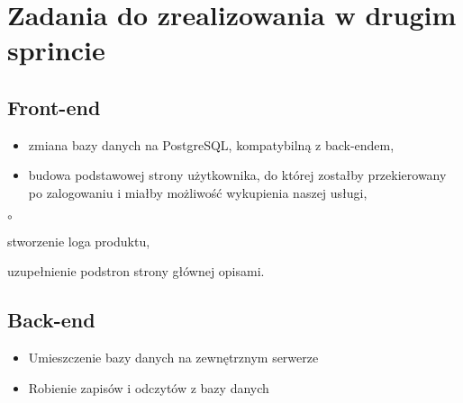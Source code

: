 \section{Zadania do zrealizowania w drugim sprincie}

\subsection*{Front-end}
\begin{itemize}
  \item zmiana bazy danych na PostgreSQL, kompatybilną z back-endem,
  \item budowa podstawowej strony użytkownika, do której zostałby przekierowany po zalogowaniu i miałby możliwość wykupienia naszej usługi,
\end{itemize}
\begin{list}{$\circ$}{} 
  \item stworzenie loga produktu,
  \item uzupełnienie podstron strony głównej opisami.
\end{list}

\subsection*{Back-end}
\begin{itemize}
    \item Umieszczenie bazy danych na zewnętrznym serwerze 
    \item Robienie zapisów i odczytów z bazy danych 
\end{itemize}